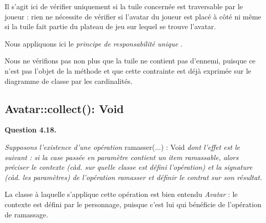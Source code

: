 \documentclass[oneside,a4paper]{book}
\begin{document}
\begin{itemize}
        Il s'agit ici de vérifier uniquement si la tuile concernée est traversable par le joueur : rien ne nécessite de vérifier si l'avatar du joueur est placé à côté ni même si la tuile fait partie du plateau de jeu sur lequel se trouve l'avatar.
        
        \begin{tcolorbox}
        Nous appliquons ici le \textit{principe de responsabilité unique} \cite{martin2003agile}.
        \end{tcolorbox}
        
        Nous ne vérifions pas non plus que la tuile ne contient pas d'ennemi, puisque ce n'est pas l'objet de la méthode et que cette contrainte est déjà exprimée sur le diagramme de classe par les cardinalités.
    
\end{itemize}

\subsection{Avatar::collect(): Void}

\textbf{Question 4.18.}\label{Question 4.18.}\newline

\nopagebreak 

\textit{Supposons l'existence d'une opération} ramasser(...) : Void \textit{dont l'effet est le suivant : si la case passée en paramètre contient un item ramassable, alors préciser le contexte (càd. sur quelle classe est défini l'opération) et la signature (càd. les paramètres) de l'opération ramasser et définir le contrat sur son résultat.}\newline

La classe à laquelle s'applique cette opération est bien entendu \textit{Avatar} : le contexte est défini par le personnage, puisque c'est lui qui bénéficie de l'opération de ramassage.
\end{document}
